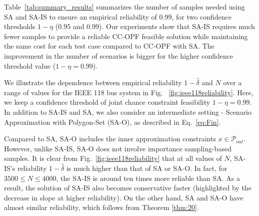 

Table~\ref{tab:summary_results} summarizes the number of samples needed using SA and SA-IS to ensure an empirical reliability of $0.99$, for two confidence thresholds $1-\eta$ ($0.95$ and $0.99$). Our experiments show that SA-IS requires much fewer samples to provide a reliable CC-OPF feasible solution while maintaining the same cost for each test case compared to CC-OPF with SA. The improvement in the number of scenarios is bigger for the higher confidence threshold value ($1-\eta=0.99$).

We illustrate the dependence between empirical reliability $1-\hat{\delta}$ and $N$ over a range of values for the IEEE 118 bus system in Fig.~ \ref{fig:ieee118reliability}. Here, we keep a confidence threshold of joint chance constraint feasibility $1-\eta =0.99$. In addition to SA-IS and SA, we also consider an intermediate setting - Scenario Approximation with Polygon-Set (SA-O), as described in Eq.~\eqref{eq:Fin}. 

Compared to SA, SA-O includes the inner approximation constraints $x \in \mathcal{P}_{out}$. However, unlike SA-IS, SA-O does not involve importance sampling-based samples. It is clear from Fig.~\ref{fig:ieee118reliability} that at all values of $N$, SA-IS's reliability $1-\hat{\delta}$ is much higher than that of SA or SA-O. In fact, for $3500\leq N \leq 4000$, the SA-IS is around ten times more reliable than SA. As a result, the solution of SA-IS also becomes conservative faster (highlighted by the decrease in slope at higher reliability). On the other hand, SA and SA-O have almost similar reliability, which follows from Theorem \ref{thm:20}. 

